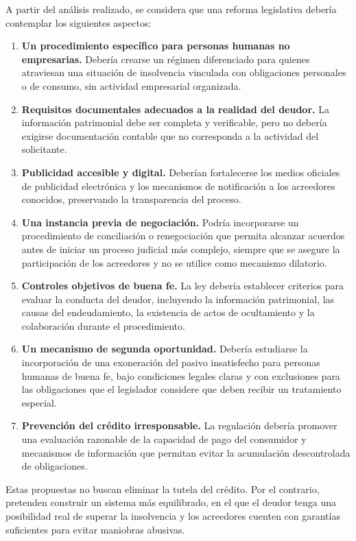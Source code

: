 \documentclass[12pt,oneside]{book}
\begin{document}
A partir del análisis realizado, se considera que una reforma legislativa debería contemplar los siguientes aspectos:

\begin{enumerate}[label=\alph*)]
    \item \textbf{Un procedimiento específico para personas humanas no empresarias.} Debería crearse un régimen diferenciado para quienes atraviesan una situación de insolvencia vinculada con obligaciones personales o de consumo, sin actividad empresarial organizada.
    \item \textbf{Requisitos documentales adecuados a la realidad del deudor.} La información patrimonial debe ser completa y verificable, pero no debería exigirse documentación contable que no corresponda a la actividad del solicitante.
    \item \textbf{Publicidad accesible y digital.} Deberían fortalecerse los medios oficiales de publicidad electrónica y los mecanismos de notificación a los acreedores conocidos, preservando la transparencia del proceso.
    \item \textbf{Una instancia previa de negociación.} Podría incorporarse un procedimiento de conciliación o renegociación que permita alcanzar acuerdos antes de iniciar un proceso judicial más complejo, siempre que se asegure la participación de los acreedores y no se utilice como mecanismo dilatorio.
    \item \textbf{Controles objetivos de buena fe.} La ley debería establecer criterios para evaluar la conducta del deudor, incluyendo la información patrimonial, las causas del endeudamiento, la existencia de actos de ocultamiento y la colaboración durante el procedimiento.
    \item \textbf{Un mecanismo de segunda oportunidad.} Debería estudiarse la incorporación de una exoneración del pasivo insatisfecho para personas humanas de buena fe, bajo condiciones legales claras y con exclusiones para las obligaciones que el legislador considere que deben recibir un tratamiento especial.
    \item \textbf{Prevención del crédito irresponsable.} La regulación debería promover una evaluación razonable de la capacidad de pago del consumidor y mecanismos de información que permitan evitar la acumulación descontrolada de obligaciones.
\end{enumerate}

Estas propuestas no buscan eliminar la tutela del crédito. Por el contrario, pretenden construir un sistema más equilibrado, en el que el deudor tenga una posibilidad real de superar la insolvencia y los acreedores cuenten con garantías suficientes para evitar maniobras abusivas.
\end{document}

